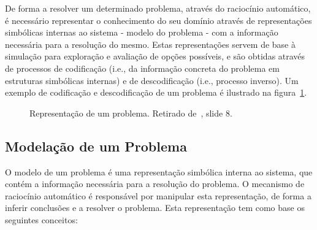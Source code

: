 De forma a resolver um determinado problema, através do raciocínio automático, é necessário representar o conhecimento do seu domínio através de representações simbólicas internas ao sistema - modelo do problema - com a informação necessária para a resolução do mesmo.
Estas representações servem de base à simulação para exploração e avaliação de opções possíveis, e são obtidas através de processos de codificação (i.e., da informação concreta do problema em estruturas simbólicas internas) e de descodificação (i.e., processo inverso).
Um exemplo de codificação e descodificação de um problema é ilustrado na figura~\ref{fig:representacao-problema}.

\begin{figure}[H]
    \begin{center}
    \end{center}
    \caption{Representação de um problema.
    Retirado de~\cite{isel:iasa:slides:racicionio-automatico}, slide 8.}
    \label{fig:representacao-problema}
\end{figure}

\subsection{Modelação de um Problema}\label{subsec:modelacao-problema}

O modelo de um problema é uma representação simbólica interna ao sistema, que contém a informação necessária para a resolução do problema.
O mecanismo de raciocínio automático é responsável por manipular esta representação, de forma a inferir conclusões e a resolver o problema.
Esta representação tem como base os seguintes conceitos:

